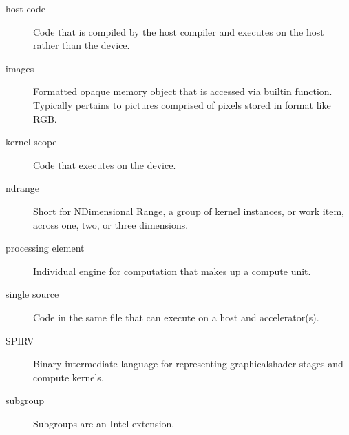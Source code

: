 \documentclass[letterpaper,10pt,english]{sphinxmanual}
\begin{document}
\begin{description}
\item[{host code\label{\detokenize{glossary:term-host-code}}}] \leavevmode
Code that is compiled by the host compiler and executes on the host
rather than the device.

\item[{images\label{\detokenize{glossary:term-images}}}] \leavevmode
Formatted opaque memory object that is accessed via built\sphinxhyphen{}in
function. Typically pertains to pictures comprised of pixels stored
in format like RGB.

\item[{kernel scope\label{\detokenize{glossary:term-kernel-scope}}}] \leavevmode
Code that executes on the device.

\item[{nd\sphinxhyphen{}range\label{\detokenize{glossary:term-nd-range}}}] \leavevmode
Short for N\sphinxhyphen{}Dimensional Range, a group of kernel instances, or work
item, across one, two, or three dimensions.

\item[{processing element\label{\detokenize{glossary:term-processing-element}}}] \leavevmode
Individual engine for computation that makes up a compute unit.

\item[{single source\label{\detokenize{glossary:term-single-source}}}] \leavevmode
Code in the same file that can execute on a host and accelerator(s).

\item[{SPIR\sphinxhyphen{}V\label{\detokenize{glossary:term-SPIR-V}}}] \leavevmode
Binary intermediate language for representing graphical\sphinxhyphen{}shader stages
and compute kernels.

\item[{sub\sphinxhyphen{}group\label{\detokenize{glossary:term-sub-group}}}] \leavevmode
Sub\sphinxhyphen{}groups are an Intel extension.


\end{description}
\end{document}

